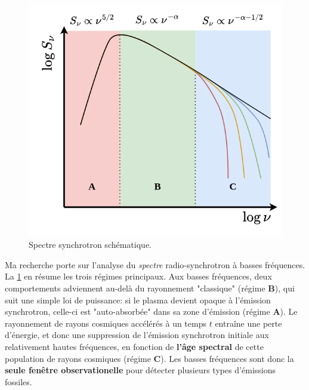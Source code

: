\begin{figure}\centering
	\vspace{-2.5\baselineskip}
	\includegraphics[width=\linewidth]{ProjetRecherche/synchrotron.drawio.png}
	\caption{Spectre synchrotron sch\'ematique.\vspace{-0.8\baselineskip}} \label{fig.synchrotron}
	\vspace{-1\baselineskip}
\end{figure}

\pg
Ma recherche porte sur l'analyse du \textit{spectre} radio-synchrotron \`a basses fr\'equences. La \cref{fig.synchrotron} en r\'esume les trois r\'egimes principaux. Aux basses fr\'equences, deux comportements adviennent au-del\`a du rayonnement "classique" (r\'egime \textbf{B}), qui suit une simple loi de puissance: si le plasma devient opaque \`a l'\'emission synchrotron, celle-ci est "auto-absorb\'ee" dans sa zone d'\'emission (r\'egime \textbf{A}). Le rayonnement de rayons cosmiques acc\'el\'er\'es \`a un temps $t$ entra\^ine une perte d'\'energie, 
et donc une suppression de l'\'emission synchrotron initiale aux relativement hautes fr\'equences, en fonction de \textbf{l'\^age spectral} de cette population de rayons cosmiques (r\'egime \textbf{C}). Les basses fr\'equences sont donc la \textbf{seule fen\^etre observationelle} pour d\'etecter plusieurs types d'\'emissions fossiles.%



